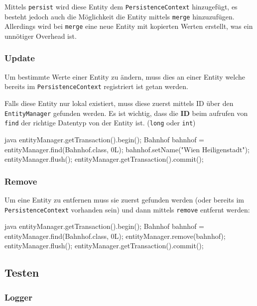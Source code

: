 Mittels \texttt{persist} wird diese Entity dem \texttt{PersistenceContext} hinzugefügt, es besteht jedoch auch die Möglichkeit die Entity mittels \texttt{merge} hinzuzufügen. Allerdings wird bei \texttt{merge} eine neue Entity mit kopierten Werten erstellt, was ein unnötiger Overhead ist.

\subsubsection{Update}

Um bestimmte Werte einer Entity zu ändern, muss dies an einer Entity welche bereits im \texttt{PersistenceContext} registriert ist getan werden.

Falls diese Entity nur lokal existiert, muss diese zuerst mittels ID über den \texttt{EntityManager} gefunden werden. Es ist wichtig, dass die \textbf{ID} beim aufrufen von \texttt{find} der richtige Datentyp von der Entity ist. (\texttt{long} oder \texttt{int})

\begin{code}{java}
entityManager.getTransaction().begin();
Bahnhof bahnhof = entityManager.find(Bahnhof.class, 0L);
bahnhof.setName("Wien Heiligenstadt");
entityManager.flush();
entityManager.getTransaction().commit();
\end{code}

\subsubsection{Remove}

Um eine Entity zu entfernen muss sie zuerst gefunden werden (oder bereits im \texttt{PersistenceContext} vorhanden sein) und dann mittels \texttt{remove} entfernt werden:

\begin{code}{java}
entityManager.getTransaction().begin();
Bahnhof bahnhof = entityManager.find(Bahnhof.class, 0L);
entityManager.remove(bahnhof);
entityManager.flush();
entityManager.getTransaction().commit();
\end{code}

\clearpage
\subsection{Testen}

\subsubsection{Logger}

